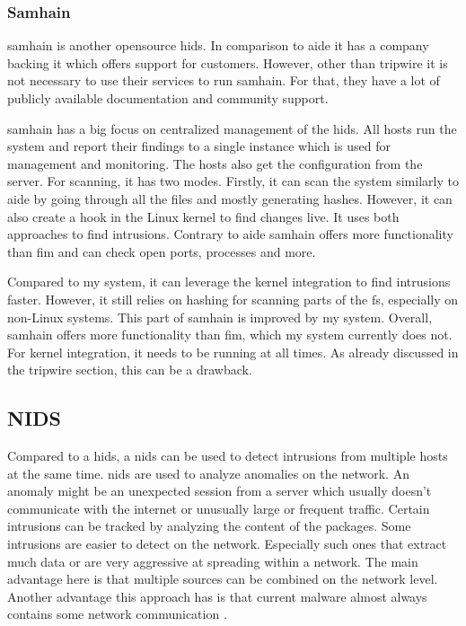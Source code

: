 \subsubsection{Samhain}
\label{sec:samhain}

\Gls{samhain} is another \gls{opensource} \gls{hids}. In comparison to \gls{aide} it has a company backing it which offers support for customers. However, other than \gls{tripwire} it is not necessary to use their services to run \gls{samhain}. For that, they have a lot of publicly available documentation and community support. \cite{samhain:company}

\Gls{samhain} has a big focus on centralized management of the \gls{hids}. All hosts run the system and report their findings to a single instance which is used for management and monitoring. The hosts also get the configuration from the server. For scanning, it has two modes. Firstly, it can scan the system similarly to \gls{aide} by going through all the files and mostly generating hashes. However, it can also create a hook in the Linux kernel to find changes live. It uses both approaches to find intrusions. Contrary to \gls{aide} \gls{samhain} offers more functionality than \gls{fim} and can check open ports, processes and more. 

Compared to my system, it can leverage the kernel integration to find intrusions faster. However, it still relies on hashing for scanning parts of the \gls{fs}, especially on non-Linux systems. This part of \gls{samhain} is improved by my system. Overall, \gls{samhain} offers more functionality than \gls{fim}, which my system currently does not. For kernel integration, it needs to be running at all times. As already discussed in the tripwire section, this can be a drawback.

\subsection{NIDS}
\label{sec:def:nids}

Compared to a \gls{hids}, a \gls{nids} can be used to detect intrusions from multiple hosts at the same time. \gls{nids} are used to analyze anomalies on the network. An \gls{anomaly} might be an unexpected session from a server which usually doesn't communicate with the internet or unusually large or frequent traffic. Certain intrusions can be tracked by analyzing the content of the packages. Some intrusions are easier to detect on the network. Especially such ones that extract much data or are very aggressive at spreading within a network. The main advantage here is that multiple sources can be combined on the network level. Another advantage this approach has is that current \gls{malware} almost always contains some network communication \cite{Malware:Behaviour,nids}.

